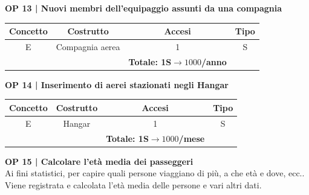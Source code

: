 \vspace{.6cm}


\textbf{\small OP 13 | Nuovi membri dell'equipaggio assunti da una compagnia}\\

\begin{tabular}{ c c c c} %
	\hline
	\textbf{Concetto} & \textbf{Costrutto} & \textbf{Accesi} & \textbf{Tipo}\\
	\hline
	\textsf{\small E} & \textsf{\small Compagnia aerea} & \textsf{\small 1} &  \textsf{\small S}\\
	\hline
	\textsf{\small } & \textsf{\small } & \textbf{Totale: 1S$\rightarrow 1000$/anno } \textsf{\small } & \textsf{\small }\\ %
	\hline
\end{tabular}

\vspace{.6cm}


\textbf{\small OP 14 | Inserimento di aerei stazionati negli Hangar}\\

\begin{tabular}{ c c c c}
	\hline
	\textbf{Concetto} & \textbf{Costrutto} & \textbf{Accesi} & \textbf{Tipo}\\
	\hline
	\textsf{\small E} & \textsf{\small Hangar} & \textsf{\small 1} &  \textsf{\small S}\\
	\hline
	\textsf{\small } & \textsf{\small } & \textbf{Totale: 1S$\rightarrow 1000$/mese } \textsf{\small } & \textsf{\small }\\ %
	\hline
\end{tabular}

\vspace{.6cm}


\textbf{\small OP 15 | Calcolare l'età media dei passeggeri}\\

\textsf{\small Ai fini statistici, per capire quali persone viaggiano di più, a che età e dove, ecc.. Viene registrata e calcolata l'età media delle persone e vari altri dati.}\break

